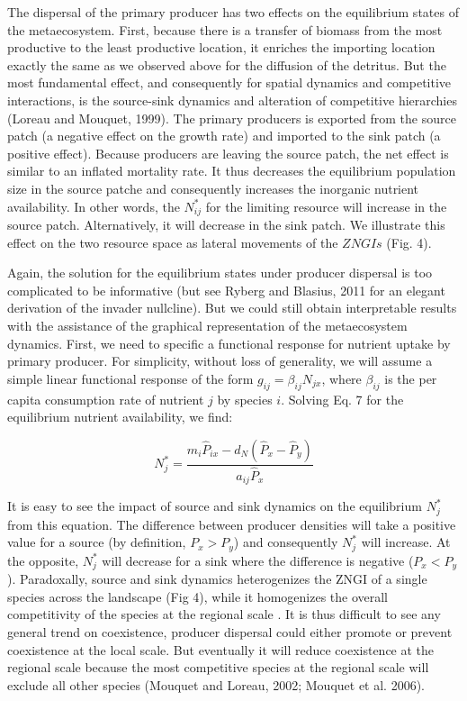 \documentclass[12pt]{paper}
\begin{document}
The dispersal of the primary producer has two effects on the equilibrium states of the metaecosystem. First, because there is a transfer of biomass from the most productive to the least productive location, it enriches the importing location exactly the same as we observed above for the diffusion of the detritus. But the most fundamental effect, and consequently for spatial dynamics and competitive interactions, is the source-sink dynamics and alteration of competitive hierarchies (Loreau and Mouquet, 1999). The primary producers is exported from the source patch (a negative effect on the growth rate) and imported to the sink patch (a positive effect). Because producers are leaving the source patch, the net effect is similar to an inflated mortality rate. It thus decreases the equilibrium population size in the source patche and consequently increases the inorganic nutrient availability. In other words, the $N^*_{ij}$ for the limiting resource will increase in the source patch. Alternatively, it will decrease in the sink patch. We illustrate this effect on the two resource space as lateral movements of the $ZNGIs$ (Fig. 4).

Again, the solution for the equilibrium states under producer dispersal is too complicated to be informative (but see Ryberg and Blasius, 2011 for an elegant derivation of the invader nullcline). But we could still obtain interpretable results with the assistance of the graphical representation of the metaecosystem dynamics. First, we need to specific a functional response for nutrient uptake by primary producer. For simplicity, without loss of generality, we will assume a simple linear functional response of the form $g_{ij} = \beta_{ij}N_{jx}$, where $\beta_{ij}$ is the per capita consumption rate of nutrient $j$ by species $i$. Solving Eq. 7 for the equilibrium nutrient availability, we find:

\begin{equation}
	\label{e:bnet}
	N^{*}_{j}=\frac{m_{i}\widehat{P}_{ix}-d_{N}(\widehat{P}_{x}-\widehat{P}_{y})}{a_{ij}\widehat{P}_{x}}
\end{equation}

It is easy to see the impact of source and sink dynamics on the equilibrium $N^{*}_{j}$ from this equation. The difference between producer densities will take a positive value for a source (by definition, $P_x>P_y$) and consequently $N^{*}_{j}$ will increase. At the opposite, $N^{*}_{j}$ will decrease for a sink where the difference is negative ($P_x<P_y$). Paradoxally, source and sink dynamics heterogenizes the ZNGI of a single species across the landscape (Fig 4), while it homogenizes the overall competitivity of the species at the regional scale \parencite{Mouquet2002}. It is thus difficult to see any general trend on coexistence, producer dispersal could either promote or prevent coexistence at the local scale. But eventually it will reduce coexistence at the regional scale because the most competitive species at the regional scale will exclude all other species (Mouquet and Loreau, 2002; Mouquet et al. 2006).  
\end{document}
